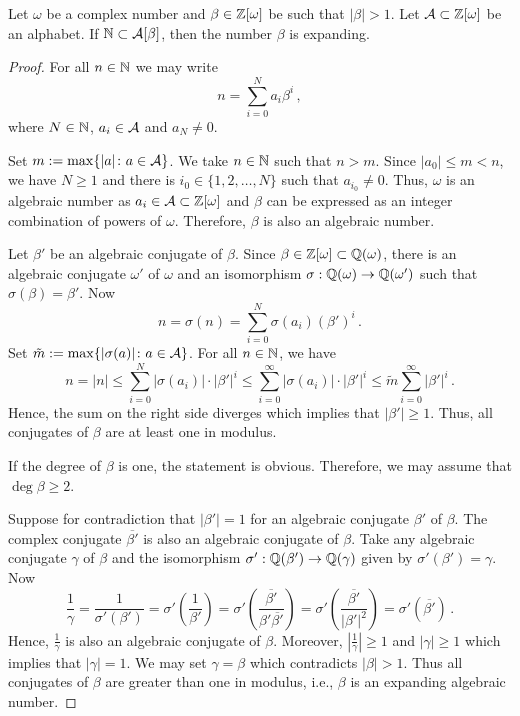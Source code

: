 \begin{thm}
\label{thm:betaExpanding}
    Let $\omega$ be a complex number and $\beta \in\mathbb{Z}[\omega]$ be such that $|\beta|>1$. Let $\mathcal{A}\subset \mathbb{Z}[\omega]$ be an alphabet. If $\mathbb{N}\subset \mathcal{A}[\beta]$, then the number $\beta$ is expanding.
\end{thm}
\begin{proof}
For all $n\in\mathbb{N}$ we may write 
    $$
    n=\sum_{i=0}^{N}a_i\beta^i\,,
    $$
    where $N\in\mathbb{N}$, $a_i\in\mathcal{A}$ and $a_N\neq 0$.
    
    Set $m:= \max\{|a|\colon a\in\mathcal{A}\}$. We take $n\in\mathbb{N}$ such that $n>m$. 
    Since $|a_0|\leq m<n$, we have  $N\geq 1$ and there is $i_0 \in \{1,2,\dots,N\}$ such that $a_{i_0}\neq 0$. Thus, $\omega$ is an algebraic number as $a_i\in\mathcal{A}\subset\mathbb{Z}[\omega]$ and $\beta$ can be expressed as an integer combination of powers of $\omega$. Therefore, $\beta$ is also an algebraic number.
    
    Let $\beta'$ be an algebraic conjugate of $\beta$.  
    Since $\beta\in\mathbb{Z}[\omega]\subset\mathbb{Q}(\omega)$, there is an algebraic conjugate $\omega'$ of $\omega$ and an isomorphism $\sigma: \mathbb{Q}(\omega)\rightarrow \mathbb{Q}(\omega')$ such that $\sigma(\beta)=\beta'$. Now 
    $$
    n=\sigma(n)=\sum_{i=0}^{N}\sigma(a_i)(\beta')^i\,.
    $$
    Set $\tilde m:= \max\{|\sigma(a)|\colon a\in\mathcal{A}\}$.  For all $n\in\mathbb{N}$, we have 
    $$
    n=|n|\leq\sum_{i=0}^{N}|\sigma(a_i)|\cdot|\beta'|^i \leq \sum_{i=0}^{\infty}|\sigma(a_i)|\cdot|\beta'|^i \leq \tilde m\sum_{i=0}^{\infty}|\beta'|^i\,.  
    $$
    Hence, the sum on the right  side diverges which implies that $|\beta'|\geq 1$. Thus, all conjugates of $\beta$ are at least one in modulus.
    
    If the degree of $\beta$ is one, the statement is obvious.  Therefore, we may assume that $\deg \beta \geq 2$. 
    
    Suppose  for contradiction that $|\beta'|=1$ for an algebraic conjugate $\beta'$  of $\beta$. The complex conjugate $\overline{\beta'}$ is also an algebraic conjugate of $\beta$. Take any algebraic conjugate $\gamma$ of $\beta$ and the isomorphism $\sigma': \mathbb{Q}(\beta')\rightarrow \mathbb{Q}(\gamma)$ given by $\sigma'(\beta')=\gamma$.
    Now
    $$
    \frac{1}{\gamma}=\frac{1}{\sigma'(\beta')}=\sigma'\left(\frac{1}{\beta'}\right)=\sigma'\left(\frac{\overline{\beta'}}{\beta'\overline{\beta'}}\right)=\sigma'\left(\frac{\overline{\beta'}}{|\beta'|^2}\right)=\sigma'(\overline{\beta'})\,.
    $$
    Hence, $\frac{1}{\gamma}$ is also an algebraic conjugate of $\beta$. Moreover, $\left|\frac{1}{\gamma}\right|\geq 1$ and $|\gamma|\geq 1$ which implies that $|\gamma|=1$. We may set $\gamma=\beta$ which contradicts $|\beta|>1$. Thus all conjugates of $\beta$ are greater than one in modulus, i.e., $\beta$ is an expanding algebraic number.
\end{proof}




